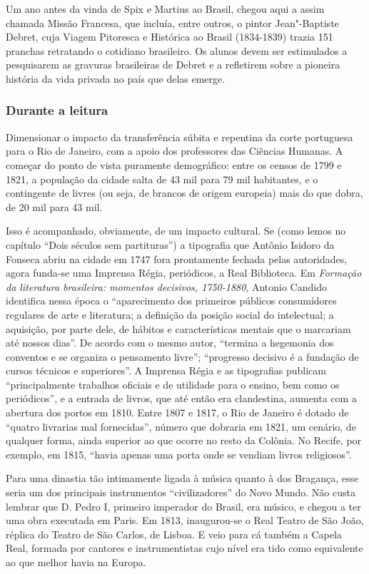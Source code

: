 \documentclass[11pt]{extarticle}
\begin{document}
Um ano antes da vinda de Spix e Martius ao Brasil, chegou aqui a assim chamada
Missão Francesa, que incluía, entre outros, o pintor Jean"-Baptiste Debret, cuja
Viagem Pitoresca e Histórica ao Brasil (1834-1839) trazia 151 pranchas
retratando o cotidiano brasileiro. Os alunos devem ser estimulados a
pesquisarem as gravuras brasileiras de Debret e a refletirem sobre a pioneira
história da vida privada no país que delas emerge.

\subsubsection{Durante a leitura}

Dimensionar o impacto da transferência súbita e repentina da corte portuguesa
para o Rio de Janeiro, com a apoio dos professores das Ciências Humanas. A começar do ponto de vista puramente demográfico: entre
os censos de 1799 e 1821, a população da cidade salta de 43 mil para 79 mil
habitantes, e o contingente de livres (ou seja, de brancos de origem europeia)
mais do que dobra, de 20 mil para 43 mil. 

Isso é acompanhado, obviamente, de um impacto cultural. Se (como lemos no
capítulo ``Dois séculos sem partituras'') a tipografia que Antônio Isidoro da
Fonseca abriu na cidade em 1747 fora prontamente fechada pelas autoridades,
agora funda-se uma Imprensa Régia, periódicos, a Real Biblioteca. Em \emph{Formação
da literatura brasileira: momentos decisivos, 1750-1880}, Antonio Candido
identifica nessa época o “aparecimento dos primeiros públicos consumidores
regulares de arte e literatura; a definição da posição social do intelectual; a
aquisição, por parte dele, de hábitos e características mentais que o marcariam
até nossos dias”. De acordo com o mesmo autor, “termina a hegemonia dos
conventos e se organiza o pensamento livre”; “progresso decisivo é a fundação
de cursos técnicos e superiores”. A Imprensa Régia e as tipografias publicam
“principalmente trabalhos oficiais e de utilidade para o ensino, bem como os
periódicos”, e a entrada de livros, que até então era clandestina, aumenta com
a abertura dos portos em 1810. Entre 1807 e 1817, o Rio de Janeiro é dotado de
“quatro livrarias mal fornecidas”, número que dobraria em 1821, um cenário, de
qualquer forma, ainda superior ao que ocorre no resto da Colônia. No Recife,
por exemplo, em 1815, “havia apenas uma porta onde se vendiam livros
religiosos”.

Para uma dinastia tão intimamente ligada à música quanto à dos Bragança, esse
seria um dos principais instrumentos “civilizadores” do Novo Mundo. Não custa
lembrar que D. Pedro I, primeiro imperador do Brasil, era músico, e chegou a
ter uma obra executada em Paris. Em 1813, inaugurou-se o Real Teatro de São
João, réplica do Teatro de São Carlos, de Lisboa. E veio para cá também a
Capela Real, formada por cantores e instrumentistas cujo nível era tido como
equivalente ao que melhor havia na Europa.
\end{document}
